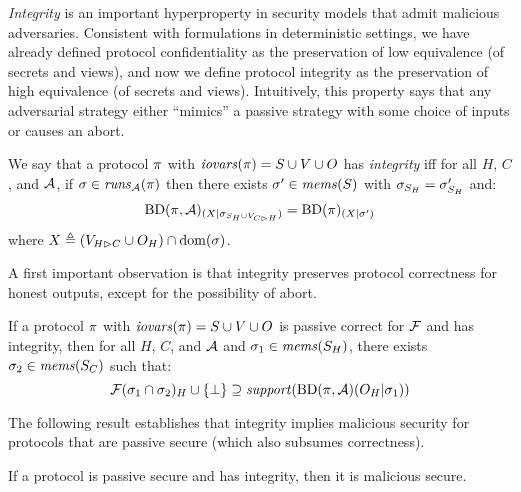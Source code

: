 \emph{Integrity} is an important hyperproperty in security models that admit
malicious adversaries. Consistent with formulations in deterministic settings,
we have already defined protocol confidentiality as the preservation of low equivalence
(of secrets and views), and now we define protocol integrity as the preservation
of high equivalence (of secrets and views). Intuitively, this property says
that any adversarial strategy either ``mimics'' a passive strategy with some
choice of inputs or causes an abort.
\begin{definition}[Integrity]
  \label{def-integrity}
  We say that a protocol $\pi$ with $\mathit{iovars}(\pi) = S \cup V \cup O$ has
  \emph{integrity} iff for all $H$, $C$, and $\mathcal{A}$,
  if $\sigma \in \mathit{runs}_{\mathcal{A}}(\pi)$ 
  then there exists $\sigma' \in \mathit{mems}(S)$ with $\sigma_{S_H} = \sigma'_{S_H} $ and:
    $$
    \mathrm{BD}(\pi,\mathcal{A})_{({X}|{\sigma_{S_H \cup V_{C \rhd H}}})} =
    \mathrm{BD}(\pi)_{({X}|{\sigma'})}
    $$ 
  where $X \triangleq (V_{H \rhd C} \cup O_H) \cap \mathrm{dom}(\sigma)$. 
\end{definition}
A first important observation is that integrity preserves protocol correctness
for honest outputs, except for the possibility of abort. 
\begin{lemma}
  \label{lemma-malicious-correct}
  If a protocol $\pi$ with $\mathit{iovars}(\pi) = S \cup V \cup O$ is passive correct for
  $\mathcal{F}$ and
  has integrity, then for all $H$, $C$, and $\mathcal{A}$ and $\sigma_1 \in \mathit{mems}(S_H)$,
  there exists $\sigma_2 \in \mathit{mems}(S_C)$ such that:
  $$
  \mathcal{F}(\sigma_1 \cap \sigma_2)_H \cup \{ \bot \} \supseteq
    \mathit{support}(\mathrm{BD}(\pi,\mathcal{A})(O_H|\sigma_1))
  $$
\end{lemma}
The following result establishes that integrity implies malicious
security for protocols that are passive secure (which also subsumes
correctness). 
\begin{theorem}
  If a protocol is passive secure and has integrity, then it
  is malicious secure.
\end{theorem}

